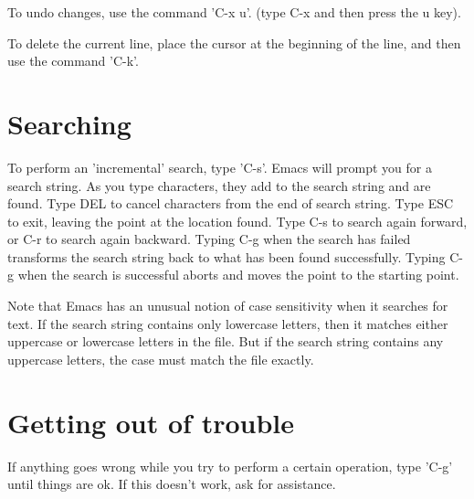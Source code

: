 \documentclass{article}
\begin{document}
\begin{flushleft}
To undo changes, use the command 'C-x u'. (type C-x and then press the u key).

To delete the current line, place the cursor at the beginning of the line, 
and then use the command 'C-k'.


\section*{Searching}
To perform an 'incremental' search, type 'C-s'. Emacs will prompt you for a 
search string. As you type characters, they add to the search string and are 
found. Type DEL to cancel characters from the end of search string. Type ESC
to exit, leaving the point at the location found. Type C-s  to search again 
forward, or C-r to search again backward. Typing C-g when the search has failed
transforms the search string back to what has been found successfully. Typing 
C-g when the search is successful aborts and moves the point to the starting 
point.

Note that Emacs has an unusual notion of case sensitivity when it searches for 
text. If the search string contains only lowercase letters, then it matches 
either uppercase or lowercase letters in the file. But if the search string 
contains any uppercase letters, the case must match the file exactly. 


\section*{Getting out of trouble}
If anything goes wrong while you try to perform a certain operation, type 
'C-g' until things are ok.  If this doesn't work, ask for assistance.

\end{flushleft}
\end{document}
